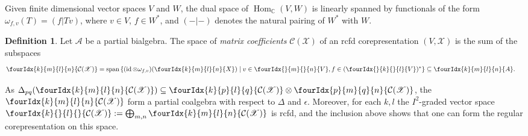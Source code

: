 \documentclass[10pt]{article}
\DeclareMathOperator{\id}{id}
\DeclareMathOperator{\Hom}{Hom}
\DeclareMathOperator{\Span}{\mathrm{span}}
\newcommand{\dual}[1]{#1^{*}}
\newcommand{\C}{\mathbb{C}}
\newcommand{\Gr}[5]{\fourIdx{#2}{#4}{#3}{#5}{#1}}%
\newcommand{\Gru}[3]{\Gr{#1}{}{}{#2}{#3}}
\newcommand{\Grd}[3]{\Gr{#1}{#2}{#3}{}{}}
\theoremstyle{definition}
\newtheorem{Def}[Theorem]{Definition}
\numberwithin{equation}{section}
\begin{document}
Given finite dimensional vector spaces $V$ and $W$, the dual space of
$\Hom_{\C}(V,W)$ is linearly spanned by functionals of the form $\omega_{f,v}(T) =  (f|Tv)$, where $v\in V$, $f\in \dual{W}$, and $(-|-)$ denotes the natural
pairing of $\dual{W}$ with $W$.
\begin{Def} Let $\mathscr{A}$ be a partial bialgebra. The space of
  \emph{matrix coefficients} $\mathcal{C}(\mathscr{X})$ of an rcfd
  corepresentation $(V,\mathscr{X})$ is the sum of the subspaces
\begin{align*}
  \Gr{\mathcal{C}(\mathscr{X})}{k}{l}{m}{n} &= \Span \left\{ (\id \otimes
    \omega_{f,v})(\Gr{X}{k}{l}{m}{n}) \mid v\in \Gru{V}{m}{n}, f \in
    \dual{(\Gru{V}{k}{l})} \right\} \subseteq \Gr{A}{k}{l}{m}{n}.
\end{align*}
\end{Def}
As $\Delta_{pq}(\Gr{\mathcal{C}(\mathscr{X})}{k}{l}{m}{n}) \subseteq
  \Gr{\mathcal{C}(\mathscr{X})}{k}{l}{p}{q} \otimes
  \Gr{\mathcal{C}(\mathscr{X})}{p}{q}{m}{n}$, the $\Gr{\mathcal{C}(\mathscr{X})}{k}{l}{m}{n}$ form a partial
coalgebra with respect to $\Delta$ and $\epsilon$.  Moreover, for each
$k,l$ the $I^{2}$-graded vector  space $\Grd{\mathcal{C}(\mathscr{X})}{k}{l}:=\bigoplus_{m,n }
  \Gr{\mathcal{C}(\mathscr{X})}{k}{l}{m}{n}$ is rcfd, and the inclusion above shows that one can
form the regular corepresentation on this space.
\end{document}
